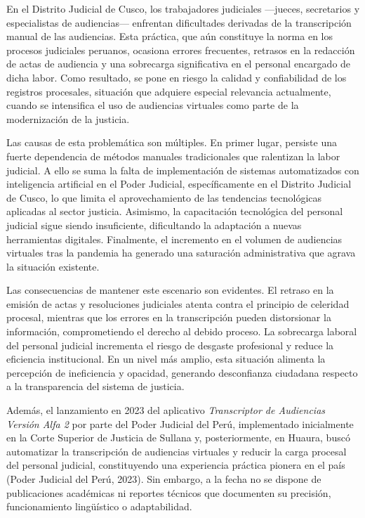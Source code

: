 \documentclass[12pt,a4paper,oneside]{report}
\begin{document}
En el Distrito Judicial de Cusco, los trabajadores judiciales —jueces, secretarios y especialistas de audiencias— enfrentan dificultades derivadas de la transcripción manual de las audiencias. Esta práctica, que aún constituye la norma en los procesos judiciales peruanos, ocasiona errores frecuentes, retrasos en la redacción de actas de audiencia y una sobrecarga significativa en el personal encargado de dicha labor. Como resultado, se pone en riesgo la calidad y confiabilidad de los registros procesales, situación que adquiere especial relevancia actualmente, cuando se intensifica el uso de audiencias virtuales como parte de la modernización de la justicia.

Las causas de esta problemática son múltiples. En primer lugar, persiste una fuerte dependencia de métodos manuales tradicionales que ralentizan la labor judicial. A ello se suma la falta de implementación de sistemas automatizados con inteligencia artificial en el Poder Judicial, específicamente en el Distrito Judicial de Cusco, lo que limita el aprovechamiento de las tendencias tecnológicas aplicadas al sector justicia. Asimismo, la capacitación tecnológica del personal judicial sigue siendo insuficiente, dificultando la adaptación a nuevas herramientas digitales. Finalmente, el incremento en el volumen de audiencias virtuales tras la pandemia ha generado una saturación administrativa que agrava la situación existente.

Las consecuencias de mantener este escenario son evidentes. El retraso en la emisión de actas y resoluciones judiciales atenta contra el principio de celeridad procesal, mientras que los errores en la transcripción pueden distorsionar la información, comprometiendo el derecho al debido proceso. La sobrecarga laboral del personal judicial incrementa el riesgo de desgaste profesional y reduce la eficiencia institucional. En un nivel más amplio, esta situación alimenta la percepción de ineficiencia y opacidad, generando desconfianza ciudadana respecto a la transparencia del sistema de justicia.

Además, el lanzamiento en 2023 del aplicativo \textit{Transcriptor de Audiencias Versión Alfa 2} por parte del Poder Judicial del Perú, implementado inicialmente en la Corte Superior de Justicia de Sullana y, posteriormente, en Huaura, buscó automatizar la transcripción de audiencias virtuales y reducir la carga procesal del personal judicial, constituyendo una experiencia práctica pionera en el país (Poder Judicial del Perú, 2023). Sin embargo, a la fecha no se dispone de publicaciones académicas ni reportes técnicos que documenten su precisión, funcionamiento lingüístico o adaptabilidad.
\end{document}

